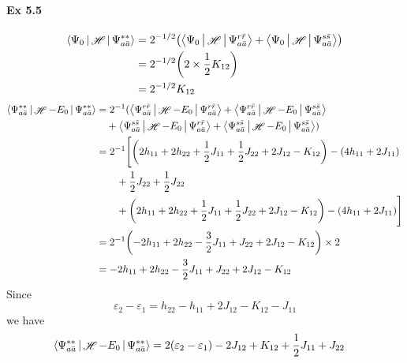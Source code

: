 \documentclass[a4paper]{article}
\DeclareMathOperator{\sH}{\mathscr{H}}
\newcommand{\ex}[1]{\paragraph{Ex #1}}
\numberwithin{equation}{subsection}
\begin{document}
\ex{5.5}
\begin{align}
\Braket{\Psi_0 | \sH | \Psi_{a\bar{a}}^{**}} &= 2^{-1/2}\qty(\Braket{\Psi_0 | \sH | \Psi_{a\bar{a}}^{r\bar{r}}} + \Braket{\Psi_0 | \sH | \Psi_{a\bar{a}}^{s\bar{s}}}) \notag\\
&= 2^{-1/2}\qty(2\times \dfrac{1}{2}K_{12} ) \notag\\
&= 2^{-1/2} K_{12}
\end{align}
\begin{align}
\Braket{\Psi_{a\bar{a}}^{**} | \sH - E_0 | \Psi_{a\bar{a}}^{**}} &= 2^{-1} (\Braket{\Psi_{a\bar{a}}^{r\bar{r}} | \sH - E_0 | \Psi_{a\bar{a}}^{r\bar{r}}} 
+ \Braket{\Psi_{a\bar{a}}^{r\bar{r}} | \sH - E_0 | \Psi_{a\bar{a}}^{s\bar{s}}} \notag\\
&{}\quad
+ \Braket{\Psi_{a\bar{a}}^{s\bar{s}} | \sH - E_0 | \Psi_{a\bar{a}}^{r\bar{r}}} 
+ \Braket{\Psi_{a\bar{a}}^{s\bar{s}} | \sH - E_0 | \Psi_{a\bar{a}}^{s\bar{s}}}) \notag\\
&= 2^{-1} \Bigg[ \qty(2h_{11} + 2h_{22} + \dfrac{1}{2}J_{11} + \dfrac{1}{2}J_{22} + 2J_{12} - K_{12}) - (4h_{11} + 2J_{11}) \notag\\
&{}\qquad + \dfrac{1}{2}J_{22} + \dfrac{1}{2}J_{22} \notag\\
&{}\qquad + \qty(2h_{11} + 2h_{22} + \dfrac{1}{2}J_{11} + \dfrac{1}{2}J_{22} + 2J_{12} - K_{12}) - (4h_{11} + 2J_{11})
 \Bigg] \notag\\
&= 2^{-1} \qty(-2h_{11} + 2h_{22} - \dfrac{3}{2}J_{11} + J_{22} + 2J_{12} - K_{12})\times 2 \notag\\
&= -2h_{11} + 2h_{22} - \dfrac{3}{2}J_{11} + J_{22} + 2J_{12} - K_{12}
\end{align}
Since
\begin{equation}\label{key}
\varepsilon_2 - \varepsilon_1 = h_{22} - h_{11} + 2J_{12} - K_{12} - J_{11}
\end{equation}
we have
\begin{align}
\Braket{\Psi_{a\bar{a}}^{**} | \sH - E_0 | \Psi_{a\bar{a}}^{**}} &= 2(\varepsilon_2 - \varepsilon_1) - 2J_{12} + K_{12} + \dfrac{1}{2}J_{11} + J_{22}
\end{align}
\end{document}
